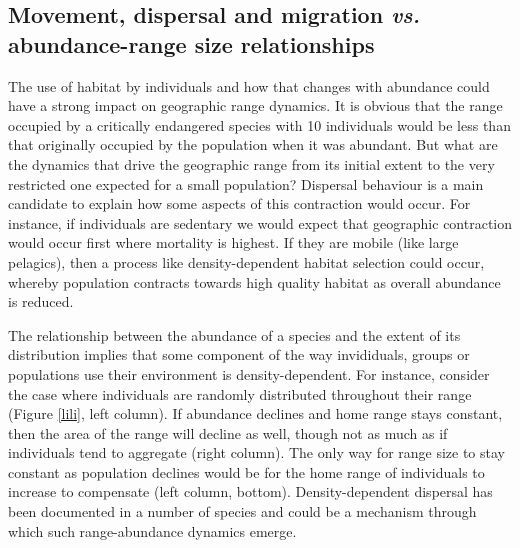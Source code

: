 \documentclass{article}
\begin{document}

\subsection{Movement, dispersal and migration \emph{vs.} abundance-range size relationships}

The use of habitat by individuals and how that changes with abundance
could have a strong impact on geographic range dynamics. It is obvious that
the range occupied by a critically endangered
species with 10 individuals would be less than that originally
occupied by the population when it was abundant. But what
are the dynamics that drive the geographic range from its initial
extent to the very restricted one expected for a small population?
Dispersal behaviour is a main candidate to explain how some
aspects of this contraction would occur. For instance, if
individuals are sedentary we would expect that geographic contraction
would occur first where mortality is highest. If they are mobile (like
large pelagics), then a process like density-dependent habitat
selection could occur, whereby population contracts towards high
quality habitat as overall abundance is reduced.

The relationship between the abundance of a species and the extent of
its distribution implies that some component of the way invididuals,
groups or populations use their environment is density-dependent. For
instance, consider the case where individuals are randomly distributed
throughout their range (Figure \ref{lili}, left column). If abundance
declines and home range stays constant, then the area of the range
will decline as well, though not as much as if individuals tend to
aggregate (right column). The only way for range size to stay constant
as population declines would be for the home range of individuals to
increase to compensate (left column, bottom).  Density-dependent
dispersal has been documented in a number of species
\citep{Matthysen2005_a} and could be a mechanism through which such
range-abundance dynamics emerge.
\end{document}
